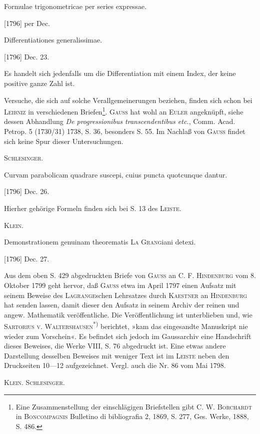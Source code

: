 \indent Formulae trigonometricae per series expressae.
\par\noindent\hfill[1796] per Dec.

\indent Differentiationes generalissimae.
\par\noindent\hfill[1796] Dec. 23.

\medskip\begingroup\small
\indent Es handelt sich jedenfalls um die Differentiation mit einem Index, der keine positive ganze Zahl ist.
\par\endgroup
\clearpage{}
\begingroup\small
\noindent Versuche, die sich auf solche Verallgemeinerungen beziehen, finden sich schon bei \textsc{Leibniz} in verschiedenen Briefen\footnote{Eine Zusammenstellung der einschlägigen Briefstellen gibt C. W. \textsc{Borchardt} in \textsc{Boncompagnis} Bulletino di bibliografia 2, 1869, S. 277, Ges. Werke, 1888, S. 486.}. \textsc{Gauss} hat wohl an \textsc{Euler} angeknüpft, siehe dessen Abhandlung \textit{De progressionibus transcendentibus etc.}, Comm. Acad. Petrop. 5 (1730/31) 1738, S. 36, besonders S. 55. Im Nachlaß von \textsc{Gauss} findet sich keine Spur dieser Untersuchungen.
\par\noindent\hfill\textsc{Schlesinger.}
\par\endgroup

\indent Curvam parabolicam quadrare suscepi, cuius puncta quotcunque dantur.
\par\noindent\hfill[1796] Dec. 26.

\medskip\begingroup\small
\indent Hierher gehörige Formeln finden sich bei S. 13 des \textsc{Leiste}.
\par\noindent\hfill\textsc{Klein.}
\par\endgroup

\indent Demonstrationem genuinam theorematis \textsc{La Grang}iani detexi.
\par\noindent\hfill[1796] Dec. 27.

\medskip\begingroup\small
\indent Aus dem oben S. 429 abgedruckten Briefe von \textsc{Gauss} an C. F. \textsc{Hindenburg} vom 8. Oktober 1799 geht hervor, daß \textsc{Gauss} etwa im April 1797 einen Aufsatz mit seinem Beweise des \textsc{Lagrange}schen Lehrsatzes durch \textsc{Kaestner} an \textsc{Hindenburg} hat senden lassen, damit dieser den Aufsatz in seinem Archiv der reinen und angew. Mathematik veröffentliche. Die Veröffentlichung ist unterblieben und, wie \textsc{Sartorius v. Waltershausen}\textsuperscript{*)} berichtet, »kam das eingesandte Manuskript nie wieder zum Vorschein«. Es befindet sich jedoch im Gaussarchiv eine Handschrift dieses Beweises, die Werke VIII, S. 76 abgedruckt ist. Eine etwas andere Darstellung desselben Beweises mit weniger Text ist im \textsc{Leiste} neben den Druckseiten 10—12 aufgezeichnet. Vergl. auch die Nr. 86 vom Mai 1798.
\begingroup\renewcommand{\thefootnote}{**)}\endgroup
\par\noindent\hfill\textsc{Klein. Schlesinger.}
\par\endgroup
